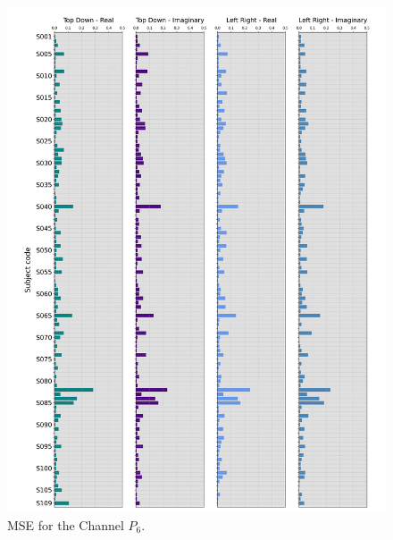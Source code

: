 \documentclass[11pt, aspectratio=169]{beamer}
\begin{document}
\begin{frame}
\begin{figure}[ht]
\begin{minipage}[b]{0.21\linewidth}
      \includegraphics[height=.5\paperheight]{../Figures/art_02/Fig13.jpg}
      \caption{MSE for the Channel $P_{6}$.}
      \label{fig24}
    \end{minipage}

  \end{figure}
\end{frame}
\end{document}
